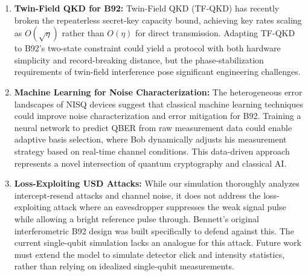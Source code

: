 \documentclass[conference]{IEEEtran}
\begin{document}
\begin{enumerate}
    \item \textbf{Twin-Field QKD for B92:} Twin-Field QKD (TF-QKD) \cite{zhong2020proof} has recently broken the repeaterless secret-key capacity bound, achieving key rates scaling as $O(\sqrt{\eta})$ rather than $O(\eta)$ for direct transmission. Adapting TF-QKD to B92's two-state constraint could yield a protocol with both hardware simplicity and record-breaking distance, but the phase-stabilization requirements of twin-field interference pose significant engineering challenges.

    \item \textbf{Machine Learning for Noise Characterization:} The heterogeneous error landscapes of NISQ devices suggest that classical machine learning techniques could improve noise characterization and error mitigation for B92. Training a neural network to predict QBER from raw measurement data could enable adaptive basis selection, where Bob dynamically adjusts his measurement strategy based on real-time channel conditions. This data-driven approach represents a novel intersection of quantum cryptography and classical AI.

    \item \textbf{Loss-Exploiting USD Attacks:} While our simulation thoroughly analyzes intercept-resend attacks and channel noise, it does not address the loss-exploiting attack where an eavesdropper suppresses the weak signal pulse while allowing a bright reference pulse through. Bennett's original interferometric B92 design was built specifically to defend against this. The current single-qubit simulation lacks an analogue for this attack. Future work must extend the model to simulate detector click and intensity statistics, rather than relying on idealized single-qubit measurements.
\end{enumerate}
\end{document}

